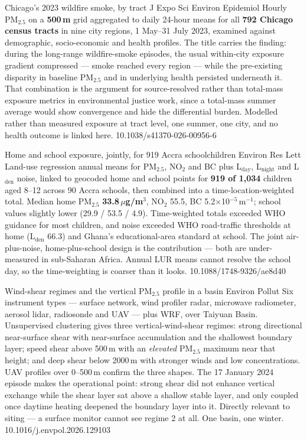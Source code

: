 \documentclass[10pt]{article}
\begin{document}

{Chicago's 2023 wildfire smoke, by tract}
{J Expo Sci Environ Epidemiol}
{Hourly PM$_{2.5}$ on a \textbf{500\,m} grid aggregated to daily 24-hour means for all
\textbf{792 Chicago census tracts} in nine city regions, 1 May--31 July 2023, examined
against demographic, socio-economic and health profiles. The title carries the finding:
during the long-range wildfire-smoke episodes, the usual within-city exposure gradient
compressed --- smoke reached every region --- while the pre-existing disparity in baseline
PM$_{2.5}$ and in underlying health persisted underneath it. That combination is the
argument for source-resolved rather than total-mass exposure metrics in environmental
justice work, since a total-mass summer average would show convergence and hide the
differential burden. Modelled rather than measured exposure at tract level, one summer, one
city, and no health outcome is linked here.}
{10.1038/s41370-026-00956-6}

{Home and school exposure, jointly, for 919 Accra schoolchildren}
{Environ Res Lett}
{Land-use regression annual means for PM$_{2.5}$, NO$_2$ and BC plus L$_\mathrm{day}$,
L$_\mathrm{night}$ and L$_\mathrm{den}$ noise, linked to geocoded home and school points
for \textbf{919 of 1{,}034} children aged 8--12 across 90 Accra schools, then combined into
a time-location-weighted total. Median home PM$_{2.5}$ \textbf{33.8\,$\mu$g/m$^3$},
NO$_2$ 55.5, BC 5.2$\times$10$^{-5}$\,m$^{-1}$; school values slightly lower
(29.9 / 53.5 / 4.9). Time-weighted totals exceeded WHO guidance for most children, and
noise exceeded WHO road-traffic thresholds at home (L$_\mathrm{den}$ 66.3) and Ghana's
educational-area standard at school. The joint air-plus-noise, home-plus-school design is
the contribution --- both are under-measured in sub-Saharan Africa. Annual LUR means
cannot resolve the school day, so the time-weighting is coarser than it looks.}
{10.1088/1748-9326/ae8d40}

{Wind-shear regimes and the vertical PM$_{2.5}$ profile in a basin}
{Environ Pollut}
{Six instrument types --- surface network, wind profiler radar, microwave radiometer,
aerosol lidar, radiosonde and UAV --- plus WRF, over Taiyuan Basin. Unsupervised clustering
gives three vertical-wind-shear regimes: strong directional near-surface shear with
near-surface accumulation and the shallowest boundary layer; speed shear above 500\,m with
an \emph{elevated} PM$_{2.5}$ maximum near that height; and deep shear below 2000\,m with
stronger winds and low concentrations. UAV profiles over 0--500\,m confirm the three
shapes. The 17 January 2024 episode makes the operational point: strong shear did not
enhance vertical exchange while the shear layer sat above a shallow stable layer, and only
coupled once daytime heating deepened the boundary layer into it. Directly relevant to
siting --- a surface monitor cannot see regime 2 at all. One basin, one winter.}
{10.1016/j.envpol.2026.129103}
\end{document}

